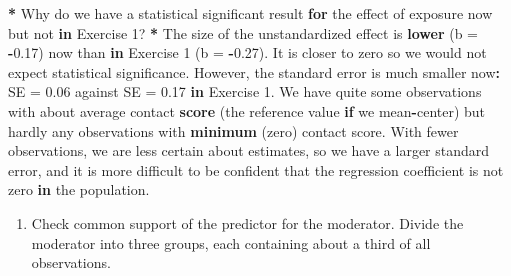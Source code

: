 \documentclass[a4paper]{book}
\newenvironment{Shaded}{\begin{snugshade}}{\end{snugshade}}
\newcommand{\KeywordTok}[1]{\textcolor[rgb]{0,0,0}{\textbf{#1}}}
\newcommand{\DataTypeTok}[1]{\textcolor[rgb]{0,0,0}{#1}}
\newcommand{\DecValTok}[1]{\textcolor[rgb]{0.00,0.00,0.00}{#1}}
\newcommand{\FloatTok}[1]{\textcolor[rgb]{0.00,0.00,0.00}{#1}}
\newcommand{\StringTok}[1]{\textcolor[rgb]{0.00,0.00,0.00}{#1}}
\newcommand{\ControlFlowTok}[1]{\textcolor[rgb]{0.00,0.00,0.00}{\textbf{#1}}}
\newcommand{\OperatorTok}[1]{\textcolor[rgb]{0.00,0.00,0.00}{\textbf{#1}}}
\newcommand{\NormalTok}[1]{#1}
\providecommand{\tightlist}{%
  \setlength{\itemsep}{0pt}\setlength{\parskip}{0pt}}
\theoremstyle{definition}
\theoremstyle{definition}
\theoremstyle{definition}
\theoremstyle{remark}
\begin{document}
\begin{Shaded}
\begin{Highlighting}[]
\OperatorTok{*}\StringTok{ }\NormalTok{Why do we have a statistical significant result }\ControlFlowTok{for}\NormalTok{ the effect of exposure}
\NormalTok{now but not }\ControlFlowTok{in}\NormalTok{ Exercise }\DecValTok{1}\NormalTok{?}
\OperatorTok{*}\StringTok{ }\NormalTok{The size of the unstandardized effect is }\KeywordTok{lower}\NormalTok{ (}\DataTypeTok{b =} \OperatorTok{-}\FloatTok{0.17}\NormalTok{) now than }\ControlFlowTok{in}
\NormalTok{Exercise }\DecValTok{1}\NormalTok{ (}\DataTypeTok{b =} \OperatorTok{-}\FloatTok{0.27}\NormalTok{). It is closer to zero so we would not expect}
\NormalTok{statistical significance. However, the standard error is much smaller now}\OperatorTok{:}\StringTok{ }\NormalTok{SE}
\NormalTok{=}\StringTok{ }\FloatTok{0.06}\NormalTok{ against SE =}\StringTok{ }\FloatTok{0.17} \ControlFlowTok{in}\NormalTok{ Exercise }\DecValTok{1}\NormalTok{. We have quite some observations with}
\NormalTok{about average contact }\KeywordTok{score}\NormalTok{ (the reference value }\ControlFlowTok{if}\NormalTok{ we mean}\OperatorTok{-}\NormalTok{center) but hardly}
\NormalTok{any observations with }\KeywordTok{minimum}\NormalTok{ (zero) contact score. With fewer observations,}
\NormalTok{we are less certain about estimates, so we have a larger standard error, and}
\NormalTok{it is more difficult to be confident that the regression coefficient is not}
\NormalTok{zero }\ControlFlowTok{in}\NormalTok{ the population.}
\end{Highlighting}
\end{Shaded}

\begin{enumerate}
\def\labelenumi{\arabic{enumi}.}
\setcounter{enumi}{3}
\tightlist
\item
  Check common support of the predictor for the moderator. Divide the
  moderator into three groups, each containing about a third of all
  observations.
\end{enumerate}
\end{document}
